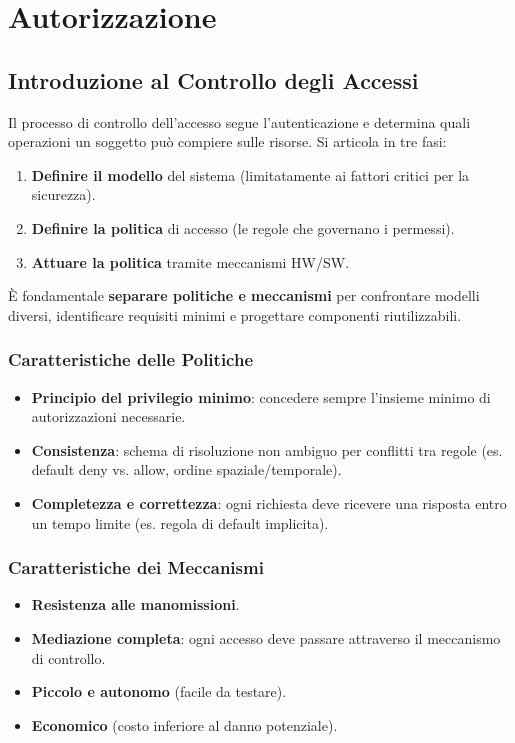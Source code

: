 \documentclass[12pt, a4paper]{report}
\begin{document}
\chapter{Autorizzazione}

\section{Introduzione al Controllo degli Accessi}

Il processo di controllo dell'accesso segue l'autenticazione e determina quali operazioni un soggetto può compiere sulle risorse. Si articola in tre fasi:

\begin{enumerate}
	\item \textbf{Definire il modello} del sistema (limitatamente ai fattori critici per la sicurezza).
	\item \textbf{Definire la politica} di accesso (le regole che governano i permessi).
	\item \textbf{Attuare la politica} tramite meccanismi HW/SW.
\end{enumerate}

È fondamentale \textbf{separare politiche e meccanismi} per confrontare modelli diversi, identificare requisiti minimi e progettare componenti riutilizzabili.

\subsection{Caratteristiche delle Politiche}
\begin{itemize}
	\item \textbf{Principio del privilegio minimo}: concedere sempre l'insieme minimo di autorizzazioni necessarie.
	\item \textbf{Consistenza}: schema di risoluzione non ambiguo per conflitti tra regole (es. default deny vs. allow, ordine spaziale/temporale).
	\item \textbf{Completezza e correttezza}: ogni richiesta deve ricevere una risposta entro un tempo limite (es. regola di default implicita).
\end{itemize}

\subsection{Caratteristiche dei Meccanismi}
\begin{itemize}
	\item \textbf{Resistenza alle manomissioni}.
	\item \textbf{Mediazione completa}: ogni accesso deve passare attraverso il meccanismo di controllo.
	\item \textbf{Piccolo e autonomo} (facile da testare).
	\item \textbf{Economico} (costo inferiore al danno potenziale).
\end{itemize}
\end{document}
